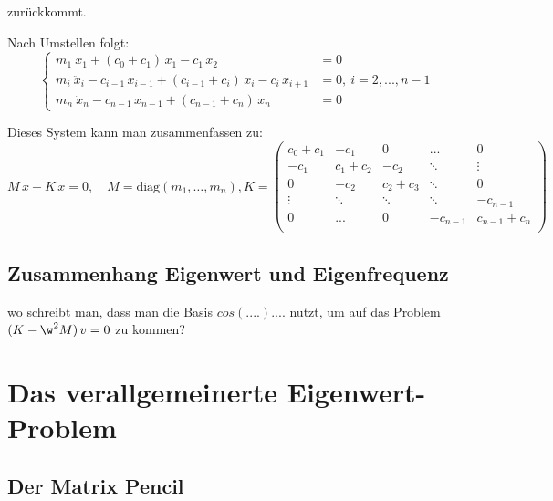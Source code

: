 \documentclass[ngerman,BCOR=4mm]{tudscrreprt}
\theoremstyle{plain} %
\theoremstyle{definition} %
\theoremstyle{remark}
\begin{document}
            zurückkommt. 

            Nach Umstellen folgt:
            \begin{equation}
                  \label{eqn: System GDgl MK 1d}
                  \begin{cases}
                        m_1\ \ddot x_1 + (c_0+c_1)\,x_1 - c_1\,x_2 & = 0   \\
                        m_i\ \ddot x_i - c_{i-1}\,x_{i-1} + (c_{i-1}+c_i)\,x_i -c_i\,x_{i+1} & = 0,\ i=2,...,n-1 \\
                        m_n\ \ddot x_n - c_{n-1}\,x_{n-1} + (c_{n-1}+c_n)\,x_n & = 0
                  \end{cases}
            \end{equation}

            Dieses System kann man zusammenfassen zu:
            $$M\,\ddot x + K\,x = 0,\quad M= \text{diag}(m_1,\dots,m_n),
            K = \begin{pmatrix}
                  c_0+c_1 & -c_1 &  0& ... & 0 \\
                  -c_1 & c_1+c_2 & -c_2 & \ddots & \vdots \\
                   0& -c_2 & c_2+c_3 & \ddots & 0 \\
                   \vdots & \ddots & \ddots & \ddots  & -c_{n-1} \\
                   0& ... & 0& -c_{n-1} & c_{n-1}+c_n \\
                  \end{pmatrix}$$

      \section{Zusammenhang Eigenwert und Eigenfrequenz}

            wo schreibt man, dass man die Basis $cos(....)....$ nutzt, um auf das Problem $(K-\w^2 M)\, v = 0$ zu kommen?


\chapter{Das verallgemeinerte Eigenwert-Problem}
\label{sec: EW Problem}
      \section{Der Matrix Pencil}
\end{document}
